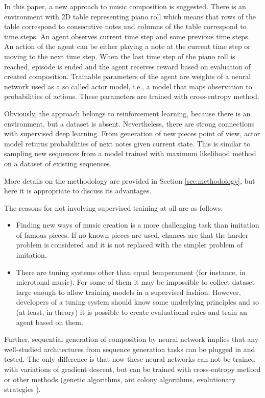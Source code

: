 \documentclass{article}
\begin{document}
In this paper, a new approach to music composition is suggested. There is an environment with 2D table representing piano roll which means that rows of the table correspond to consecutive notes and columns of the table correspond to time steps. An agent observes current time step and some previous time steps. An action of the agent can be either playing a note at the current time step or moving to the next time step. When the last time step of the piano roll is reached, episode is ended and the agent receives reward based on evaluation of created composition. Trainable parameters of the agent are weights of a neural network used as a so called actor model, i.e., a model that maps observation to probabilities of actions. These parameters are trained with cross-entropy method.

Obviously, the approach belongs to reinforcement learning, because there is an environment, but a dataset is absent. Nevertheless, there are strong connections with supervised deep learning. From generation of new pieces point of view, actor model returns probabilities of next notes given current state. This is similar to sampling new sequences from a model trained with maximum likelihood method on a dataset of existing sequences.

More details on the methodology are provided in Section \ref{sec:methodology}, but here it is appropriate to discuss its advantages.

The reasons for not involving supervised training at all are as follows:
\begin{itemize}
	\item Finding new ways of music creation is a more challenging task than imitation of famous pieces. If no known pieces are used, chances are that the harder problem is considered and it is not replaced with the simpler problem of imitation.
	\item There are tuning systems other than equal temperament (for instance, in microtonal music). For some of them it may be impossible to collect dataset large enough to allow training models in a supervised fashion. However, developers of a tuning system should know some underlying principles and so (at least, in theory) it is possible to create evaluational rules and train an agent based on them.
\end{itemize}

Further, sequential generation of composition by neural network implies that any well-studied architectures from sequence generation tasks can be plugged in and tested. The only difference is that now these neural networks can not be trained with variations of gradient descent, but can be trained with cross-entropy method or other methods (genetic algorithms, ant colony algorithms, evolutionary strategies \cite{salimans2017evolution}).
\end{document}
